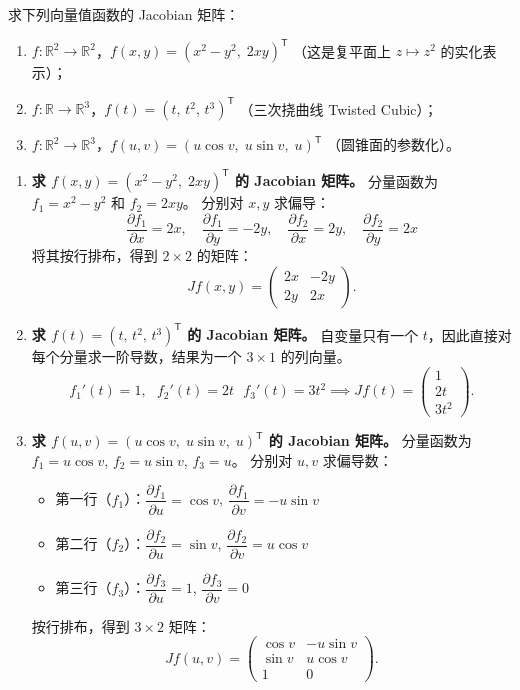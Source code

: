 \documentclass[lang=cn,11pt]{elegantbook}
\begin{document}
\begin{exercise}
求下列向量值函数的 Jacobian 矩阵：
\begin{enumerate}
  \item[(1)] $f:\mathbb R^2\to\mathbb R^2$，$f(x,y)=(x^2-y^2,\;2xy)^{\mathsf T}$
        （这是复平面上 $z\mapsto z^2$ 的实化表示）；
  \item[(2)] $f:\mathbb R\to\mathbb R^3$，$f(t)=(t,\,t^2,\,t^3)^{\mathsf T}$
        （三次挠曲线 Twisted Cubic）；
  \item[(3)] $f:\mathbb R^2\to\mathbb R^3$，$f(u,v)=(u\cos v,\;u\sin v,\;u)^{\mathsf T}$
        （圆锥面的参数化）。
\end{enumerate}
\end{exercise}
\begin{solution}
\begin{enumerate}
  \item[(1)] \textbf{求 $f(x,y)=(x^2-y^2,\;2xy)^{\mathsf T}$ 的 Jacobian 矩阵。}
  分量函数为 $f_1 = x^2-y^2$ 和 $f_2 = 2xy$。
  分别对 $x, y$ 求偏导：
  \[\dfrac{\partial f_1}{\partial x} = 2x, \quad \dfrac{\partial f_1}{\partial y} = -2y,\quad\dfrac{\partial f_2}{\partial x} = 2y, \quad \dfrac{\partial f_2}{\partial y} = 2x\]
  将其按行排布，得到 $2 \times 2$ 的矩阵：
  \[
  Jf(x,y) = \begin{pmatrix} 2x & -2y \\ 2y & 2x \end{pmatrix}.
  \]

  \item[(2)] \textbf{求 $f(t)=(t,\,t^2,\,t^3)^{\mathsf T}$ 的 Jacobian 矩阵。}
  自变量只有一个 $t$，因此直接对每个分量求一阶导数，结果为一个 $3 \times 1$ 的列向量。
  \[f_1'(t) = 1,~~~f_2'(t) = 2t~~~f_3'(t) = 3t^2\implies  Jf(t) = \begin{pmatrix} 1 \\ 2t \\ 3t^2 \end{pmatrix}.  \]

  \item[(3)] \textbf{求 $f(u,v)=(u\cos v,\;u\sin v,\;u)^{\mathsf T}$ 的 Jacobian 矩阵。}
  分量函数为 $f_1 = u\cos v$, $f_2 = u\sin v$, $f_3 = u$。
  分别对 $u, v$ 求偏导数：
  \begin{itemize}
    \item 第一行（$f_1$）：$\dfrac{\partial f_1}{\partial u} = \cos v$, \quad $\dfrac{\partial f_1}{\partial v} = -u\sin v$
    \item 第二行（$f_2$）：$\dfrac{\partial f_2}{\partial u} = \sin v$, \quad $\dfrac{\partial f_2}{\partial v} = u\cos v$
    \item 第三行（$f_3$）：$\dfrac{\partial f_3}{\partial u} = 1$, \quad $\dfrac{\partial f_3}{\partial v} = 0$
  \end{itemize}
  按行排布，得到 $3 \times 2$ 矩阵：
  \[
  Jf(u,v) = \begin{pmatrix} 
  \cos v & -u\sin v \\ 
  \sin v & u\cos v \\ 
  1 & 0 
  \end{pmatrix}.
  \]
\end{enumerate}
\end{solution}
\end{document}
